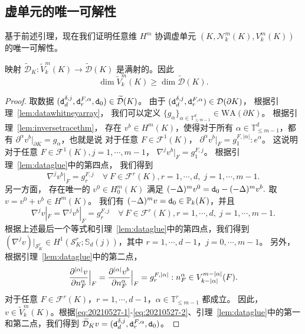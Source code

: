 \subsection{虚单元的唯一可解性}\label{subsec:vemunisolvence}
基于前述引理，现在我们证明任意维 $H^m$ 协调虚单元 $(K, \mathcal N_k^m(K), V_k^m(K))$ 的唯一可解性。
\begin{lemma}\label{lem:tidleVkdim}
映射 $\widetilde{\mathcal D}_K: \widetilde{V}_k^m(K)\to\widetilde{\mathcal D}(K)$ 是满射的。因此
$$
\dim \widetilde{V}_k^m(K)\geq\dim \widetilde{\mathcal D}(K). %
$$
\end{lemma}
\begin{proof}
取数据 $(\textnormal{\texttt{d}}_{d}^{\delta, j}, \textnormal{\texttt{d}}_{r}^{F, \alpha}, \textnormal{\texttt{d}}_0)\in\widetilde{\mathcal D}(K)$。
由于 $(\textnormal{\texttt{d}}_{d}^{\delta, j}, \textnormal{\texttt{d}}_{r}^{F, \alpha})\in\mathcal D(\partial K)$，
根据引理~\ref{lem:datawhitneyarray}，
我们可以定义 
$\{g_{\alpha}\}_{\alpha\in \mathbb{T}^d_{\leq m-1}}\in \textrm{WA}(\partial K)$。
根据引理~\ref{lem:inversetracethm}，
存在 $v^b\in H^m(K)$，使得对于所有 $\alpha\in \mathbb{T}^d_{\leq m-1}$，都有 $\partial^{\alpha}v^b|_{\partial K}=g_{\alpha}$，也就是说
对于任意 $F\in\mathcal F^1(K)$，
$
\partial^{\alpha}v^b|_F=g_{1}^{F,|\alpha|}:e^{\alpha}$。
这说明对于任意 $F\in\mathcal F^1(K), j=1,\cdots, m-1$，
$\nabla^jv^b|_F=g_{1}^{F, j}$。
根据引理~\ref{lem:dataglue}中的第四点，
我们得到
$$
\nabla^jv^b|_F=g_{r}^{F, j}\quad\forall~F\in\mathcal F^r(K), r=1,\cdots, d,\; j=1,\cdots, m-1.
$$
另一方面，
存在唯一的 $v^0\in H_0^m(K)$ 满足
$
(-\Delta)^mv^0=\textnormal{\texttt{d}}_0-(-\Delta)^mv^b.
$
取 $v=v^0+v^b\in H^m(K)$。
我们有 $(-\Delta)^mv=\textnormal{\texttt{d}}_0\in\mathbb P_{k}(K)$，并且
\begin{equation}\label{eq:20210527-1}  
\nabla^jv|_F=\nabla^jv^b|_F=g_{r}^{F, j}\quad\forall~F\in\mathcal F^r(K),
r=1,\cdots, d, \; j=1,\cdots, m-1.
\end{equation}
根据上述最后一个等式和引理~\ref{lem:dataglue}中的第四点，我们得到
$(\nabla^jv)|_{\mathcal S_K^r}\in H^1(\mathcal S_K^r;\mathbb S_{d}(j))$，其中 $r=1,\cdots, d-1$，$j=0,\cdots,m-1$。
另外，根据引理~\ref{lem:dataglue}中的第二点，
\begin{equation}\label{eq:20210527-2}  
\frac{\partial^{|\alpha|}v}{\partial
n_F^{\alpha}}\Big|_F=\frac{\partial^{|\alpha|}v^b}{\partial
n_F^{\alpha}}\Big|_F=g_{r}^{F, |\alpha|}:n_F^{\alpha}\in
V_{k-|\alpha|}^{m-|\alpha|}(F).
\end{equation}
对于任意 $F\in\mathcal F^{r}(K)$，$r=1,\cdots, d-1$，$\alpha\in
\mathbb{T}^r_{\leq m-1}$ 都成立。
因此，
$v\in \widetilde{V}_k^m(K)$。根据\eqref{eq:20210527-1}-\eqref{eq:20210527-2}、引理~\ref{lem:dataglue}中的第一和第二点，我们得到 $\widetilde{\mathcal D}_Kv=(\textnormal{\texttt{d}}_{d}^{\delta, j}, \textnormal{\texttt{d}}_{r}^{F, \alpha}, \textnormal{\texttt{d}}_0)$。
\end{proof}

